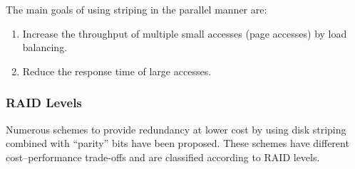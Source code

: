 The main goals of using striping in the parallel manner are:
\begin{enumerate}[noitemsep]
\item Increase the throughput of multiple small accesses (page accesses) by load balancing.
\item Reduce the response time of large accesses.
\end{enumerate}

\subsubsection{RAID Levels}\label{subsubsec:RAID_Levels}
Numerous schemes to provide redundancy at lower cost by using disk striping combined with ``parity'' bits have been proposed.
These schemes have different cost–performance trade-offs and are classified according to RAID levels.

